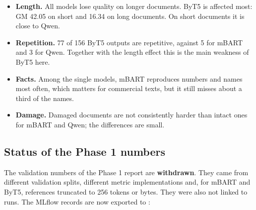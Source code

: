 \documentclass[a4paper,12pt]{article}
\begin{document}
\begin{itemize}
    \item \textbf{Length.} All models lose quality on longer documents. ByT5 is affected most: GM 42.05 on short and 16.34 on long documents. On short documents it is close to Qwen.
    \item \textbf{Repetition.} 77 of 156 ByT5 outputs are repetitive, against 5 for mBART and 3 for Qwen. Together with the length effect this is the main weakness of ByT5 here.
    \item \textbf{Facts.} Among the single models, mBART reproduces numbers and names most often, which matters for commercial texts, but it still misses about a third of the names.
    \item \textbf{Damage.} Damaged documents are not consistently harder than intact ones for mBART and Qwen; the differences are small.
\end{itemize}

\subsection{Status of the Phase 1 numbers}
\label{sec:phaseone}
The validation numbers of the Phase 1 report are \textbf{withdrawn}. They came from different validation splits, different metric implementations and, for mBART and ByT5, references truncated to 256 tokens or bytes. They were also not linked to runs. The MLflow records are now exported to :
\end{document}
